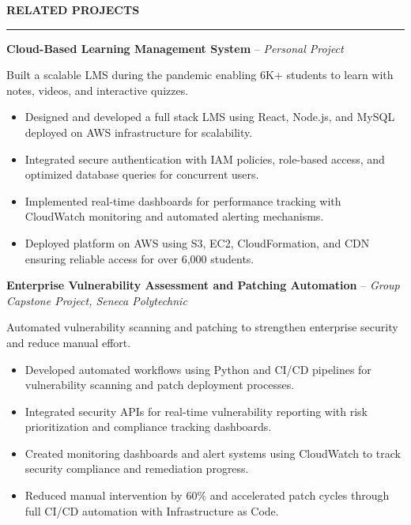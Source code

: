 \documentclass[10pt,letterpaper]{article}
\begin{document}
\vspace{6pt}

\textbf{RELATED PROJECTS}\\[-8pt]
\noindent\rule{\textwidth}{1pt}

\vspace{-2pt}

\textbf{Cloud-Based Learning Management System} -- \emph{Personal Project}

\vspace{-1pt}

Built a scalable LMS during the pandemic enabling 6K+ students to learn with notes, videos, and interactive quizzes.
\vspace{-1pt}
\begin{itemize}
\item Designed and developed a full stack LMS using React, Node.js, and MySQL deployed on AWS infrastructure for scalability.
\item Integrated secure authentication with IAM policies, role-based access, and optimized database queries for concurrent users.
\item Implemented real-time dashboards for performance tracking with CloudWatch monitoring and automated alerting mechanisms.
\item Deployed platform on AWS using S3, EC2, CloudFormation, and CDN ensuring reliable access for over 6,000 students.
\end{itemize}

\textbf{Enterprise Vulnerability Assessment and Patching Automation} -- \emph{Group Capstone Project, Seneca Polytechnic}

\vspace{-1pt}

Automated vulnerability scanning and patching to strengthen enterprise security and reduce manual effort.
\vspace{-1pt}
\begin{itemize}
\item Developed automated workflows using Python and CI/CD pipelines for vulnerability scanning and patch deployment processes.
\item Integrated security APIs for real-time vulnerability reporting with risk prioritization and compliance tracking dashboards.
\item Created monitoring dashboards and alert systems using CloudWatch to track security compliance and remediation progress.
\item Reduced manual intervention by 60\% and accelerated patch cycles through full CI/CD automation with Infrastructure as Code.
\end{itemize}
\end{document}
